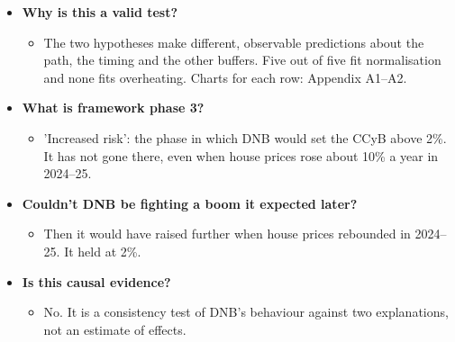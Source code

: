 \documentclass[10pt]{article}
\begin{document}
\begin{tcolorbox}[sbox,width=0.495\linewidth,height=14.6cm,nobeforeafter,box align=top,fit basedim=11pt,colframe=nlred!70,colbacktitle=nlred!8,coltitle=nlred,title=LIKELY CHALLENGES · definitions and logic]
\begin{itemize}
\item[\textcolor{navy}{\textbf{Q}}] \textbf{Why is this a valid test?}
\begin{itemize}
\item The two hypotheses make different, observable predictions about the path, the timing and the other buffers. Five out of five fit normalisation and none fits overheating. Charts for each row: Appendix A1–A2.
\end{itemize}
\item[\textcolor{navy}{\textbf{Q}}] \textbf{What is framework phase 3?}
\begin{itemize}
\item 'Increased risk': the phase in which DNB would set the CCyB above 2\%. It has not gone there, even when house prices rose about 10\% a year in 2024–25.
\end{itemize}
\item[\textcolor{navy}{\textbf{Q}}] \textbf{Couldn't DNB be fighting a boom it expected later?}
\begin{itemize}
\item Then it would have raised further when house prices rebounded in 2024–25. It held at 2\%.
\end{itemize}
\item[\textcolor{navy}{\textbf{Q}}] \textbf{Is this causal evidence?}
\begin{itemize}
\item No. It is a consistency test of DNB's behaviour against two explanations, not an estimate of effects.
\end{itemize}
\end{itemize}
\end{tcolorbox}
\newpage
\end{document}
